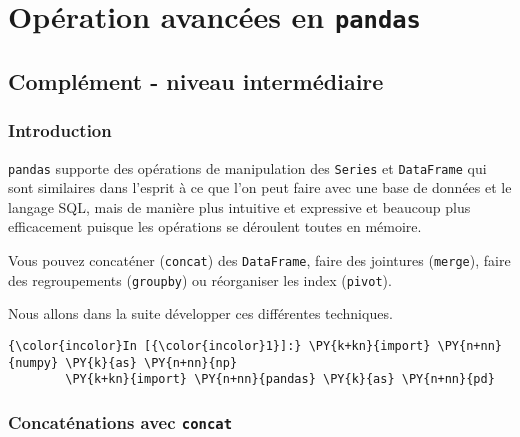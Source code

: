     
    
    
    

    

    \hypertarget{opuxe9ration-avancuxe9es-en-pandas}{%
\section{\texorpdfstring{Opération avancées en
\texttt{pandas}}{Opération avancées en pandas}}\label{opuxe9ration-avancuxe9es-en-pandas}}

    \hypertarget{compluxe9ment---niveau-intermuxe9diaire}{%
\subsection{Complément - niveau
intermédiaire}\label{compluxe9ment---niveau-intermuxe9diaire}}

    \hypertarget{introduction}{%
\subsubsection{Introduction}\label{introduction}}

    \texttt{pandas} supporte des opérations de manipulation des
\texttt{Series} et \texttt{DataFrame} qui sont similaires dans l'esprit
à ce que l'on peut faire avec une base de données et le langage SQL,
mais de manière plus intuitive et expressive et beaucoup plus
efficacement puisque les opérations se déroulent toutes en mémoire.

Vous pouvez concaténer (\texttt{concat}) des \texttt{DataFrame}, faire
des jointures (\texttt{merge}), faire des regroupements
(\texttt{groupby}) ou réorganiser les index (\texttt{pivot}).

Nous allons dans la suite développer ces différentes techniques.

    \begin{Verbatim}[commandchars=\\\{\}]
{\color{incolor}In [{\color{incolor}1}]:} \PY{k+kn}{import} \PY{n+nn}{numpy} \PY{k}{as} \PY{n+nn}{np}
        \PY{k+kn}{import} \PY{n+nn}{pandas} \PY{k}{as} \PY{n+nn}{pd}
\end{Verbatim}


    \hypertarget{concatuxe9nations-avec-concat}{%
\subsubsection{\texorpdfstring{Concaténations avec
\texttt{concat}}{Concaténations avec concat}}\label{concatuxe9nations-avec-concat}}


